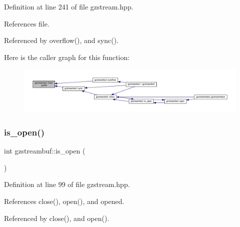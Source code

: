 Definition at line 241 of file gzstream.\+hpp.



References file.



Referenced by overflow(), and sync().

Here is the caller graph for this function\+:
\nopagebreak
\begin{figure}[H]
\begin{center}
\leavevmode
\includegraphics[width=350pt]{d7/de3/classgzstreambuf_a1f5ae8e8283961711376c1dbbaa1ee75_icgraph}
\end{center}
\end{figure}
\mbox{\label{classgzstreambuf_a89e97aaae92b72d41c20223ed7e71308}} 
\subsubsection{\texorpdfstring{is\+\_\+open()}{is\_open()}}
{\footnotesize\ttfamily int gzstreambuf\+::is\+\_\+open (\begin{DoxyParamCaption}{ }\end{DoxyParamCaption})\hspace{0.3cm}{\ttfamily [inline]}}



Definition at line 99 of file gzstream.\+hpp.



References close(), open(), and opened.



Referenced by close(), and open().

